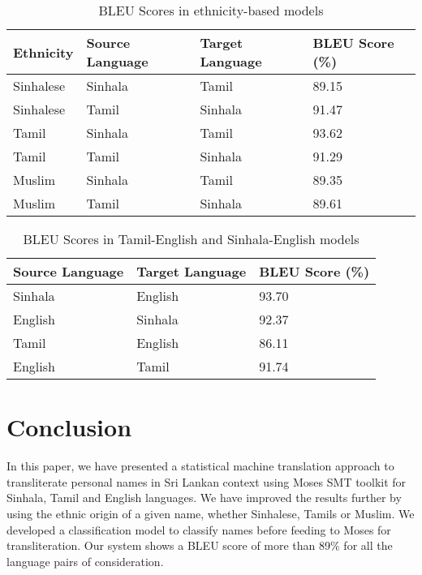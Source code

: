 \documentclass[10pt, a4paper, conference, compsocconf]{IEEEtran}
\begin{document}
\begin{table}
\caption{  BLEU Scores in ethnicity-based models  }

\begin{tabularx}{\columnwidth}{X|X|X|X}
    \hline
   Ethnicity  &  Source Language & Target Language & BLEU Score (\%)\\
    \hline
    

   	Sinhalese & Sinhala & Tamil & 89.15\\
     \hline
	Sinhalese & Tamil & Sinhala & 91.47\\
	 \hline
	Tamil & Sinhala & Tamil & 93.62\\
	 \hline
	Tamil & Tamil & Sinhala & 91.29\\
	 \hline
 	Muslim & Sinhala & Tamil & 89.35\\
 	 \hline
	Muslim & Tamil & Sinhala & 89.61\\
	 \hline
    
\end{tabularx}
\label{table:table 4}
\end{table}


\begin{table}
\caption{  BLEU Scores in Tamil-English and Sinhala-English models  }

\begin{tabularx}{\columnwidth}{X|X|X}
    \hline
   Source Language & Target Language & BLEU Score (\%)\\
    \hline
    

     Sinhala & English & 93.70\\
     \hline
	 English & Sinhala & 92.37\\
	 \hline
	 Tamil & English & 86.11\\
	 \hline
	 English & Tamil & 91.74\\
	 \hline

    
\end{tabularx}
\label{table:table 5}
\end{table}





\section{Conclusion }	 	
 In this paper, we have presented a statistical machine translation approach to transliterate personal names in Sri Lankan context using Moses SMT toolkit for Sinhala, Tamil and English languages. We have improved the results further by using the ethnic origin of a given name, whether Sinhalese, Tamils or Muslim. We developed a classification model to classify names before feeding to Moses for transliteration. Our system shows a BLEU score of more than 89\% for all the language pairs of consideration. 
\end{document}
